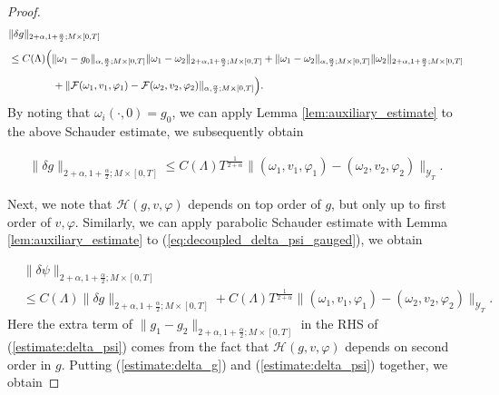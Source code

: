 \documentclass{amsart}
\theoremstyle{definition}
\theoremstyle{remark}
\numberwithin{equation}{section}
\begin{document}
\begin{proof}
\begin{equation}
	\begin{aligned}
		&\|\delta g\|_{2+\alpha,1+\frac{\alpha}{2};M\times[0,T]}\\[1ex]
		& \leq C(\Lambda) \Big(  \|\omega_1-g_0\|_{\alpha,\frac{\alpha}{2};M\times[0,T]}\|\omega_1 - \omega_2\|_{2+\alpha,1+\frac{\alpha}{2};M\times[0,T]} + \|\omega_1 - \omega_2\|_{\alpha,\frac{\alpha}{2};M\times[0,T]}\|\omega_2\|_{2+\alpha,1+\frac{\alpha}{2};M\times[0,T]}\\[1ex]
		&\hspace{1.5cm} + \|\mathcal{F}(\omega_1, v_1,\varphi_1) - \mathcal{F}(\omega_2, v_2,\varphi_2)\|_{\alpha,\frac{\alpha}{2};M\times[0,T]} \Big).
	\end{aligned}
\end{equation}
By noting that $\omega_i(\cdot,0) = g_0$, we can apply  Lemma \ref{lem:auxiliary_estimate} to the above Schauder estimate, we subsequently obtain

\begin{equation}\label{estimate:delta_g}
	\begin{aligned}
		\|\delta g\|_{2+\alpha,1+\frac{\alpha}{2};M\times[0,T]} \leq C(\Lambda) T^{\frac{1}{2+\alpha}}  \|(\omega_1,v_1,\varphi_1) - (\omega_2,v_2,\varphi_2)\|_{\mathcal{Y}_T} .
	\end{aligned}
\end{equation}
\medskip

Next, we note that $\mathcal{H}(g, v,\varphi)$ depends on top order of $g$, but only up to first order of $v,\varphi$. Similarly, we can apply parabolic Schauder estimate with Lemma \ref{lem:auxiliary_estimate} to (\ref{eq:decoupled_delta_psi_gauged}), we obtain

\begin{equation}\label{estimate:delta_psi}
	\begin{aligned}
		&\|\delta \psi\|_{2+\alpha,1+\frac{\alpha}{2};M\times[0,T]} \\[1ex]
		&\leq C(\Lambda) 	\|\delta g\|_{2+\alpha,1+\frac{\alpha}{2};M\times[0,T]} + C(\Lambda) T^{\frac{1}{2+\alpha}}\|(\omega_1,v_1,\varphi_1) - (\omega_2,v_2,\varphi_2)\|_{\mathcal{Y}_T}.
	\end{aligned}
\end{equation}
Here the extra term of $\|g_1 - g_2\|_{2+\alpha,1+\frac{\alpha}{2};M\times[0,T]}$ in the RHS of (\ref{estimate:delta_psi}) comes from the fact that $\mathcal{H}(g,v,\varphi)$ depends on second order in $g$. Putting (\ref{estimate:delta_g}) and (\ref{estimate:delta_psi}) together, we obtain


\end{proof}
\end{document}
